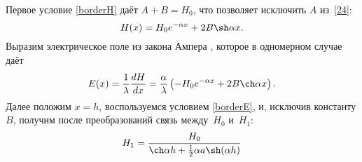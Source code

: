 Первое условие \eqref{borderH} даёт $A+B = H_0$, что 
позволяет исключить $A$ из~\eqref{24}:
\[
H(x) = H_0 e^{-\alpha x} + 2B \sh \alpha x.
\]
Выразим электрическое поле из закона Ампера , 
которое в одномерном случае даёт 
\[
E(x) = \frac{1}{\lambda} \frac{dH}{dx} = 
\frac{\alpha}{\lambda}\left(-H_0 e^{-\alpha x}+ 2B \ch \alpha x\right).
\]
Далее положим $x=h$, воспользуемся условием \eqref{borderE},
и, исключив константу $B$, получим после преобразований связь
между~$H_0$ и~$H_1$:
\begin{equation}\eqmark{H0H1}
H_1 = \frac{H_0}{\ch \alpha h + \frac12 \alpha a \sh (\alpha h)}
\end{equation}

%
%

